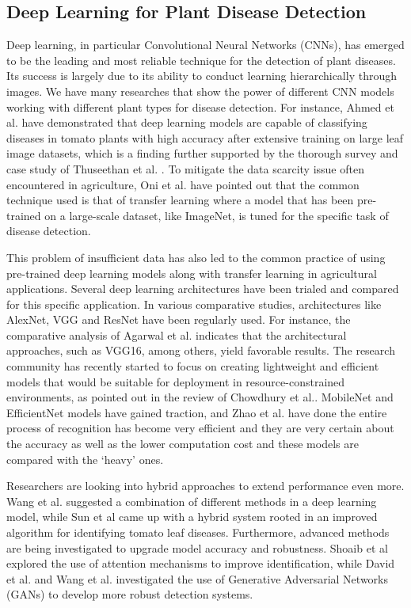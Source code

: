 \documentclass[pdflatex,sn-mathphys-num,iicol]{sn-jnl} %
\theoremstyle{thmstyleone}
\theoremstyle{thmstyletwo}
\theoremstyle{thmstylethree}
\begin{document}
\subsection{Deep Learning for Plant Disease Detection}

Deep learning, in particular Convolutional Neural Networks (CNNs), has emerged to be the leading and most reliable technique for the detection of plant diseases. Its success is largely due to its ability to conduct learning hierarchically through images. We have many researches that show the power of different CNN models working with different plant types for disease detection. For instance, Ahmed et al. \cite{10} have demonstrated that deep learning models are capable of classifying diseases in tomato plants with high accuracy after extensive training on large leaf image datasets, which is a finding further supported by the thorough survey and case study of Thuseethan et al. \cite{11}. To mitigate the data scarcity issue often encountered in agriculture, Oni et al. \cite{12} have pointed out that the common technique used is that of transfer learning where a model that has been pre-trained on a large-scale dataset, like ImageNet, is tuned for the specific task of disease detection.

This problem of insufficient data has also led to the common practice of using pre-trained deep learning models along with transfer learning in agricultural applications. Several deep learning architectures have been trialed and compared for this specific application. In various comparative studies, architectures like AlexNet, VGG and ResNet have been regularly used. For instance, the comparative analysis of Agarwal et al. \cite{14} indicates that the architectural approaches, such as VGG16, among others, yield favorable results. The research community has recently started to focus on creating lightweight and efficient models that would be suitable for deployment in resource-constrained environments, as pointed out in the review of Chowdhury et al.\cite{16}. MobileNet and EfficientNet models have gained traction, and  Zhao et al. \cite{17} have done the entire process of recognition has become very efficient and they are very certain about the accuracy as well as the lower computation cost and these models are compared with the ‘heavy’ ones.

Researchers are looking into hybrid approaches to extend performance even more. Wang et al. \cite{18} suggested a combination of different methods in a deep learning model, while Sun et al \cite{19} came up with a hybrid system rooted in an improved algorithm for identifying tomato leaf diseases. Furthermore, advanced methods are being investigated to upgrade model accuracy and robustness. Shoaib et al \cite{20} explored the use of attention mechanisms to improve identification, while  David et al. \cite{21} and Wang et al. \cite{22} investigated the use of Generative Adversarial Networks (GANs) to develop more robust detection systems.
\end{document}
